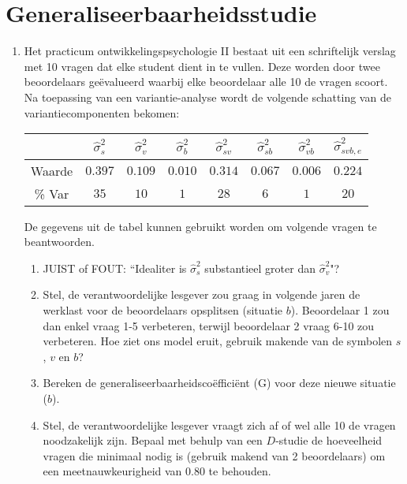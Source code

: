 
\OPGAVE
{
\section{Generaliseerbaarheidsstudie}

\begin{enumerate}

\item
Het practicum ontwikkelingspsychologie II bestaat uit een schriftelijk verslag met 10 vragen dat elke student dient in te vullen. Deze worden door twee beoordelaars ge\"{e}valueerd waarbij elke beoordelaar alle 10 de vragen scoort.\\
Na toepassing van een variantie-analyse wordt de volgende schatting van de variantiecomponenten bekomen:

\begin{center}
\renewcommand{\arraystretch}{1.2}
\begin{tabular}{|c|c|c|c|c|c|c|c|} \hline
 & $ \hat{\sigma}^2_{s} $ & $ \hat{\sigma}^2_{v} $& $ \hat{\sigma}^2_{b} $ & $ \hat{\sigma}^2_{sv} $ & $ \hat{\sigma}^2_{sb} $ & $ \hat{\sigma}^2_{vb} $ & $ \hat{\sigma}^2_{svb,e} $ \\ \hline
Waarde  & $ 0.397 $ & $ 0.109 $ & $ 0.010 $ & $ 0.314 $ & $ 0.067 $ & $ 0.006 $ & $ 0.224 $ \\
\% Var & $ 35 $ & $ 10 $ & $ 1 $ & $ 28 $ & $ 6 $ & $ 1 $ & $ 20 $ \\ \hline
\end{tabular}
\end{center}


\normalsize
De gegevens uit de tabel kunnen gebruikt worden om volgende vragen te beantwoorden.

\begin{enumerate}
\item JUIST of FOUT: ``Idealiter is $ \hat{\sigma}^2_{s} $ substantieel groter dan $ \hat{\sigma}^2_{v}$"?
\item Stel, de verantwoordelijke lesgever zou graag in volgende jaren de werklast voor de beoordelaars opsplitsen (situatie $b$). Beoordelaar 1 zou dan enkel vraag 1-5 verbeteren, terwijl beoordelaar 2 vraag 6-10 zou verbeteren. Hoe ziet ons model eruit, gebruik makende van de symbolen $s$, $v$ en $b$?
\item Bereken de generaliseerbaarheidsco\"{e}ffici\"{e}nt (G) voor deze nieuwe situatie ($b$).

\item Stel, de verantwoordelijke lesgever vraagt zich af of wel alle 10 de vragen noodzakelijk zijn. Bepaal met behulp van een $D$-studie de hoeveelheid vragen die minimaal nodig is (gebruik makend van 2 beoordelaars) om een meetnauwkeurigheid van 0.80 te behouden.


\end{enumerate}
\end{enumerate}
}

